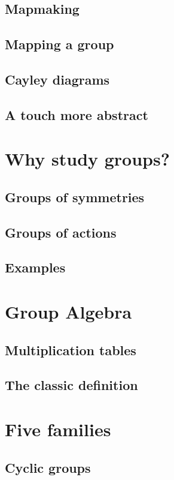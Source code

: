 \subsection{Mapmaking}
\subsection{Mapping a group}
\subsection{Cayley diagrams}
\subsection{A touch more abstract}

\section{Why study groups?}
\subsection{Groups of symmetries}
\subsection{Groups of actions}
\subsection{Examples}

\section{Group Algebra}
\subsection{Multiplication tables}
\subsection{The classic definition}

\pagebreak

\section{Five families}
\subsection{Cyclic groups}
